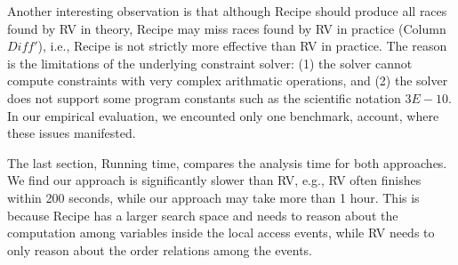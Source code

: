  

Another interesting observation is that although {\sf Recipe} should 
produce all races found by {\sf RV} in theory, {\sf Recipe} may miss 
races found by {\sf RV} in practice (Column $Diff'$), i.e., {\sf Recipe} 
is not strictly more effective than {\sf RV} in practice. The reason  is 
the limitations of the underlying constraint solver: (1) the solver cannot 
compute constraints with very complex arithmatic operations, and (2) the 
solver does not support some program constants such as the scientific 
notation $3E-10$. In our empirical evaluation, we encounted only one 
benchmark, account, where these issues manifested.

The last section, Running time, compares the analysis time for both 
approaches. We find our approach is significantly slower than {\sf RV}, 
e.g., {\sf RV} often finishes within 200 seconds, while our approach may 
take more than 1 hour. This is because {\sf Recipe} has a larger search 
space and needs to reason about the computation among variables inside 
the local access events, while {\sf RV} needs to only reason about 
the order relations among the events.


 













